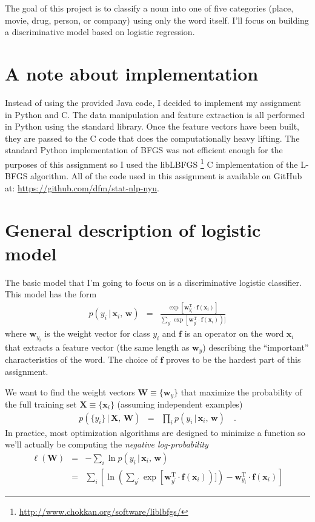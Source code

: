 \documentclass[11pt]{article}
\newcommand{\bvec}[1]{\ensuremath{\boldsymbol{#1}}}
\newcommand{\T}{^\mathrm{T}}
\newcommand{\code}[1]{{\sffamily #1}}
\begin{document}
The goal of this project is to classify a noun into one of five categories
(\code{place}, \code{movie}, \code{drug}, \code{person}, or \code{company})
using only the word itself.
I'll focus on building a discriminative model based on logistic regression.

\section{A note about implementation}

Instead of using the provided Java code, I decided to implement my assignment
in Python and C.
The data manipulation and feature extraction is all performed in Python using
the standard library.
Once the feature vectors have been built, they are passed to the C code that
does the computationally heavy lifting.
The standard Python implementation of \code{BFGS} was not efficient enough for
the purposes of this assignment so I used the \code{libLBFGS}%
\footnote{\url{http://www.chokkan.org/software/liblbfgs/}} C implementation
of the \code{L-BFGS} algorithm.
All of the code used in this assignment is available on GitHub at:
\url{https://github.com/dfm/stat-nlp-nyu}.

\section{General description of logistic model}

The basic model that I'm going to focus on is a discriminative logistic
classifier.
This model has the form
\begin{eqnarray}
p(y_i\,|\,\bvec{x}_i,\,\bvec{w}) &=&
\frac{\exp\left[\bvec{w}_{y_i}\T\cdot\bvec{f}(\bvec{x}_i)\right]}
{\sum_{y^\prime}
\exp\left[\bvec{w}_{y^\prime}\T\cdot\bvec{f}(\bvec{x}_i)\right)]}
\end{eqnarray}
where $\bvec{w}_{y_i}$ is the weight vector for class $y_i$ and $\bvec{f}$ is
an operator on the word $\bvec{x}_i$ that extracts a feature vector (the same
length as $\bvec{w}_y$) describing the ``important'' characteristics of the
word.
The choice of $\bvec{f}$ proves to be the hardest part of this assignment.

We want to find the weight vectors $\bvec{W}\equiv\{\bvec{w}_y\}$
that maximize the probability of the full training set
$\bvec{X}\equiv\{\bvec{x}_i\}$ (assuming independent examples)
\begin{eqnarray}
p(\{y_i\}\,|\,\bvec{X},\,\bvec{W}) &=&
\prod_i p(y_i\,|\,\bvec{x}_i,\,\bvec{w})\quad.
\end{eqnarray}
In practice, most optimization algorithms are designed to minimize a function
so we'll actually be computing the \emph{negative log-probability}
\begin{eqnarray}
\ell(\bvec{W}) &=&
-\sum_i \ln p(y_i\,|\,\bvec{x}_i,\,\bvec{w}) \nonumber\\
&=&
\sum_{i} \left [
\ln\left (\sum_{y^\prime}
\exp\left[\bvec{w}_{y^\prime}\T\cdot\bvec{f}(\bvec{x}_i)\right)]\right)
- \bvec{w}_{y_i}\T\cdot\bvec{f}(\bvec{x}_i) \right ]
\label{eq:logistic}
\end{eqnarray}
\end{document}
